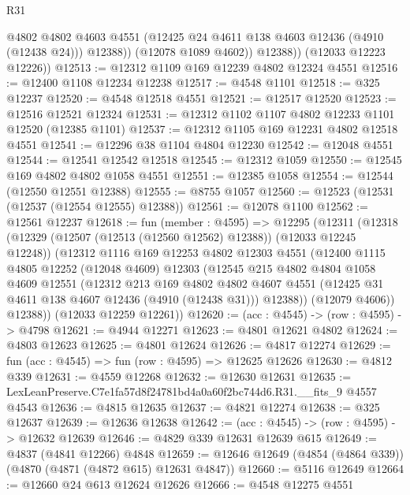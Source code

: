 \begin{lexlean}{R31}
\begin{coremodule}
                @4802
                @4802
                @4603
                @4551
                (@12425 @24 @4611 @138 @4603 @12436 (@4910 (@12438 @24)))
                @12388))
            (@12078 @1089 @4602))
          @12388))
      (@12033 @12223 @12226))
@12513 := @12312 @1109 @169 @12239 @4802 @12324 @4551
@12516 := @12400 @1108 @12234 @12238
@12517 := @4548 @1101
@12518 := @325 @12237
@12520 := @4548 @12518 @4551
@12521 := @12517 @12520
@12523 := @12516 @12521 @12324
@12531 := @12312 @1102 @1107 @4802 @12233 @1101 @12520 (@12385 @1101)
@12537 := @12312 @1105 @169 @12231 @4802 @12518 @4551
@12541 := @12296 @38 @1104 @4804 @12230
@12542 := @12048 @4551
@12544 := @12541 @12542 @12518
@12545 := @12312 @1059
@12550 := @12545 @169 @4802 @4802 @1058 @4551
@12551 := @12385 @1058
@12554 := @12544 (@12550 @12551 @12388)
@12555 := @8755 @1057
@12560 := @12523 (@12531 (@12537 (@12554 @12555) @12388))
@12561 := @12078 @1100
@12562 := @12561 @12237
@12618 := fun (member : @4595) =>
  @12295
    (@12311
      (@12318
        (@12329 (@12507 (@12513 (@12560 @12562) @12388)) (@12033 @12245 @12248))
        (@12312
          @1116
          @169
          @12253
          @4802
          @12303
          @4551
          (@12400
            @1115
            @4805
            @12252
            (@12048 @4609)
            @12303
            (@12545
              @215
              @4802
              @4804
              @1058
              @4609
              @12551
              (@12312
                @213
                @169
                @4802
                @4802
                @4607
                @4551
                (@12425 @31 @4611 @138 @4607 @12436 (@4910 (@12438 @31)))
                @12388))
            (@12079 @4606))
          @12388))
      (@12033 @12259 @12261))
@12620 := (acc : @4545) -> (row : @4595) -> @4798
@12621 := @4944 @12271
@12623 := @4801 @12621 @4802
@12624 := @4803 @12623
@12625 := @4801 @12624
@12626 := @4817 @12274
@12629 := fun (acc : @4545) => fun (row : @4595) => @12625 @12626
@12630 := @4812 @339
@12631 := @4559 @12268
@12632 := @12630 @12631
@12635 := LexLeanPreserve.C7e1fa57d8f24781bd4a0a60f2bc744d6.R31.__fits_9 @4557 @4543
@12636 := @4815 @12635
@12637 := @4821 @12274
@12638 := @325 @12637
@12639 := @12636 @12638
@12642 := (acc : @4545) -> (row : @4595) -> @12632 @12639
@12646 := @4829 @339 @12631 @12639 @615
@12649 := @4837 (@4841 @12266) @4848
@12659 := @12646 @12649 (@4854 (@4864 @339)) (@4870 (@4871 (@4872 @615) @12631 @4847))
@12660 := @5116 @12649
@12664 := @12660 @24 @613 @12624 @12626
@12666 := @4548 @12275 @4551

\end{coremodule}
\end{lexlean}
